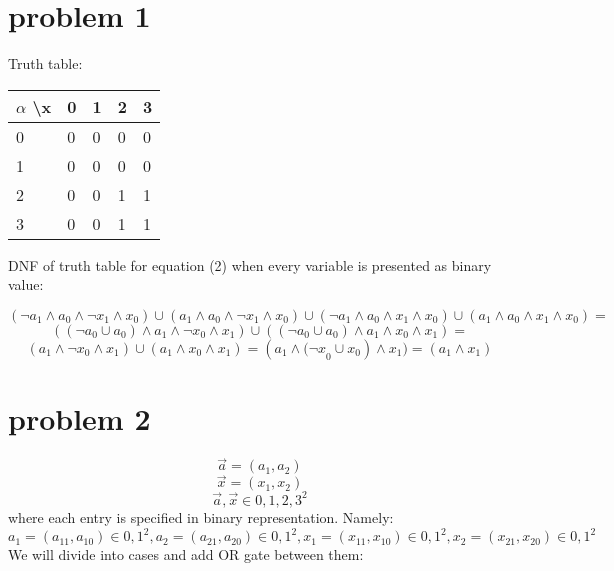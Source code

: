 \documentclass[11pt]{article}
\begin{document}

\section*{problem 1}
Truth table:
\begin{center}
\begin{tabular}{ | m{1cm} | m{.5cm} | m{.5cm} | m{.5cm}| m{.5cm} | } 
  \hline
  $\alpha$ \textbackslash x  & 0 & 1 & 2 & 3 \\ 
  \hline
  0 & 0 & 0 & 0 & 0 \\ 
  \hline
  1 & 0 & 0 & 0 & 0\\ 
  \hline
  2 & 0 & 0 & 1 & 1 \\ 
  \hline
  3 & 0 & 0 & 1 & 1\\ 
  \hline
\end{tabular}
\end{center}


 DNF of truth table for equation (2) when every variable is presented as binary value:
 
 \begin{equation*}
 (\lnot a_1\wedge a_0\wedge\lnot x_1\wedge x_0)\cup(a_1\wedge a_0\wedge\lnot x_1\wedge x_0)\cup(\lnot a_1\wedge a_0\wedge x_1\wedge x_0)\cup(a_1\wedge a_0\wedge x_1\wedge x_0)=\end{equation*} 
 \begin{equation*}
 ((\lnot a_0\cup a_0)\wedge a_1 \wedge{ \lnot x}_0 \wedge x_1)\cup(( \lnot a_0 \cup a_0)\wedge a_1\wedge x_0\wedge x_1)=\end{equation*}  \begin{equation*}(a_1\wedge{\lnot x}_0\wedge x_1)\cup(a_1\wedge x_0\wedge x_1)=(a_1\wedge{(\lnot x}_0\cup x_0)\wedge x_1)=(a_1\wedge x_1)
 \end{equation*}
   

\section*{problem 2}


 \begin{equation*} \overrightarrow{a} = (a_{1}, a_{2})\end{equation*}   \begin{equation*}
    \overrightarrow{x} = (x_{1}, x_{2})
\end{equation*}  \begin{equation*}\overrightarrow{a},\overrightarrow{x} \in{0,1,2,3^2}  \end{equation*}
where each entry is specified in binary representation. Namely:   \begin{equation*}
a_1=(a_{11},a_{10})\in{{{0,1}}}^2,a_2=(a_{21},a_{20})\in{{0,1}}^2,x_1=(x_{11},x_{10})\in{{0,1}}^2,x_2=(x_{21},x_{20})\in{{0,1}}^2
\end{equation*}
We will divide into cases and add OR gate between them:
\end{document}
